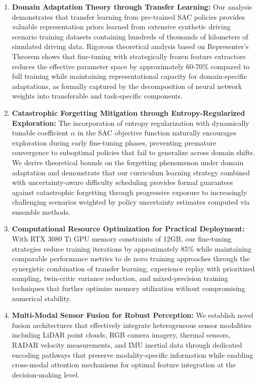 \documentclass[10pt,twocolumn,letterpaper]{article}
\begin{document}
\begin{enumerate}
    \item \textbf{Domain Adaptation Theory through Transfer Learning:} Our analysis demonstrates that transfer learning from pre-trained SAC policies provides valuable representation priors learned from extensive synthetic driving scenario training datasets containing hundreds of thousands of kilometers of simulated driving data. Rigorous theoretical analysis based on Representer's Theorem shows that fine-tuning with strategically frozen feature extractors reduces the effective parameter space by approximately 60-70\% compared to full training while maintaining representational capacity for domain-specific adaptations, as formally captured by the decomposition of neural network weights into transferable and task-specific components.

    \item \textbf{Catastrophic Forgetting Mitigation through Entropy-Regularized Exploration:} The incorporation of entropy regularization with dynamically tunable coefficient $\alpha$ in the SAC objective function naturally encourages exploration during early fine-tuning phases, preventing premature convergence to suboptimal policies that fail to generalize across domain shifts. We derive theoretical bounds on the forgetting phenomenon under domain adaptation and demonstrate that our curriculum learning strategy combined with uncertainty-aware difficulty scheduling provides formal guarantees against catastrophic forgetting through progressive exposure to increasingly challenging scenarios weighted by policy uncertainty estimates computed via ensemble methods.

    \item \textbf{Computational Resource Optimization for Practical Deployment:} With RTX 3080 Ti GPU memory constraints of 12GB, our fine-tuning strategies reduce training iterations by approximately 85\% while maintaining comparable performance metrics to de novo training approaches through the synergistic combination of transfer learning, experience replay with prioritized sampling, twin-critic variance reduction, and mixed-precision training techniques that further optimize memory utilization without compromising numerical stability.

    \item \textbf{Multi-Modal Sensor Fusion for Robust Perception:} We establish novel fusion architectures that effectively integrate heterogeneous sensor modalities including LiDAR point clouds, RGB camera imagery, thermal sensors, RADAR velocity measurements, and IMU inertial data through dedicated encoding pathways that preserve modality-specific information while enabling cross-modal attention mechanisms for optimal feature integration at the decision-making level.
\end{enumerate}
\end{document}
